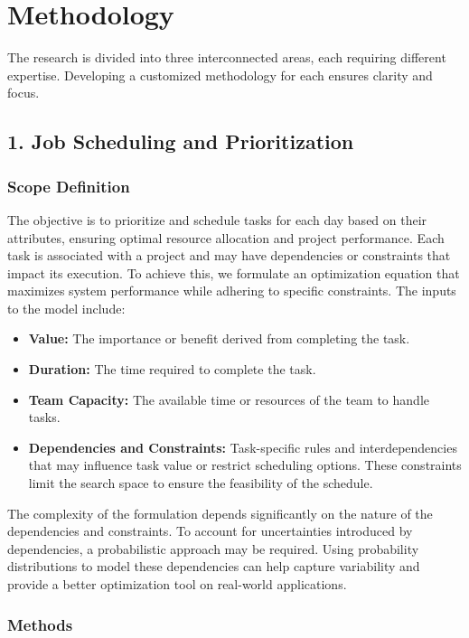 \documentclass[12pt]{article}
\begin{document}
\section*{Methodology}

The research is divided into three interconnected areas, each requiring different expertise. Developing a customized methodology for each ensures clarity and focus.

\subsection*{1. Job Scheduling and Prioritization}

\subsubsection*{Scope Definition}

The objective is to prioritize and schedule tasks for each day based on their attributes, ensuring optimal resource allocation and project performance. Each task is associated with a project and may have dependencies or constraints that impact its execution. To achieve this, we formulate an optimization equation that maximizes system performance while adhering to specific constraints. The inputs to the model include:

\begin{itemize} 
\item \textbf{Value:} The importance or benefit derived from completing the task. \item \textbf{Duration:} The time required to complete the task. 
\item \textbf{Team Capacity:} The available time or resources of the team to handle tasks. 
\item \textbf{Dependencies and Constraints:} Task-specific rules and interdependencies that may influence task value or restrict scheduling options. These constraints limit the search space to ensure the feasibility of the schedule. \end{itemize}

The complexity of the formulation depends significantly on the nature of the dependencies and constraints. To account for uncertainties introduced by dependencies, a probabilistic approach may be required. Using probability distributions to model these dependencies can help capture variability and provide a better optimization tool on real-world applications.

\subsubsection*{Methods}
\end{document}
